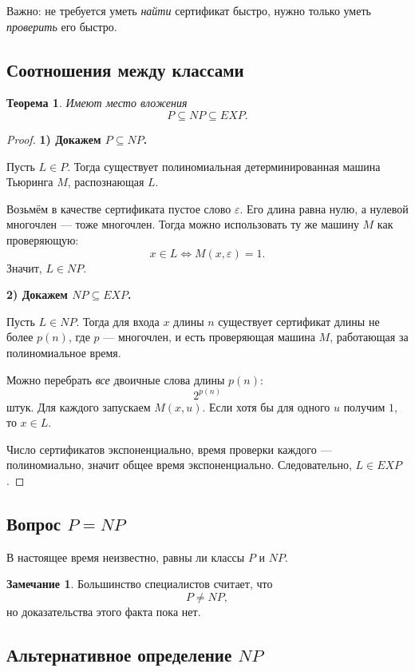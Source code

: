 \documentclass[12pt,a4paper]{article}
\theoremstyle{definition}
\newtheorem{remark}{Замечание}[section]
\theoremstyle{plain}
\newtheorem{theorem}{Теорема}[section]
\begin{document}
Важно: не требуется уметь \emph{найти} сертификат быстро, нужно только уметь \emph{проверить} его быстро.

\subsection{Соотношения между классами}
\begin{theorem}
Имеют место вложения
\[
P\subseteq NP\subseteq EXP.
\]
\end{theorem}

\begin{proof}
\textbf{1) Докажем $P\subseteq NP$.}

Пусть $L\in P$. Тогда существует полиномиальная детерминированная машина Тьюринга $M$, распознающая $L$.

Возьмём в качестве сертификата пустое слово $\varepsilon$. Его длина равна нулю, а нулевой многочлен --- тоже многочлен. Тогда можно использовать ту же машину $M$ как проверяющую:
\[
x\in L \iff M(x,\varepsilon)=1.
\]
Значит, $L\in NP$.

\medskip
\noindent
\textbf{2) Докажем $NP\subseteq EXP$.}

Пусть $L\in NP$. Тогда для входа $x$ длины $n$ существует сертификат длины не более $p(n)$, где $p$ --- многочлен, и есть проверяющая машина $M$, работающая за полиномиальное время.

Можно перебрать \emph{все} двоичные слова длины $p(n)$:
\[
2^{p(n)}
\]
штук. Для каждого запускаем $M(x,u)$. Если хотя бы для одного $u$ получим $1$, то $x\in L$.

Число сертификатов экспоненциально, время проверки каждого --- полиномиально, значит общее время экспоненциально. Следовательно, $L\in EXP$.
\end{proof}

\subsection{Вопрос \texorpdfstring{$P=NP$}{P=NP}}
В настоящее время неизвестно, равны ли классы $P$ и $NP$.

\begin{remark}
Большинство специалистов считает, что
\[
P\ne NP,
\]
но доказательства этого факта пока нет.
\end{remark}

\subsection{Альтернативное определение \texorpdfstring{$NP$}{NP}}
\end{document}
